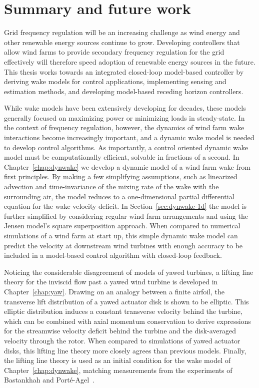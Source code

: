 \chapter{Summary and future work}
\label{chap:conclusions}

Grid frequency regulation will be an increasing challenge as wind energy and other renewable energy sources continue to grow. Developing controllers that allow wind farms to provide secondary frequency regulation for the grid effectively will therefore speed adoption of renewable energy sources in the future. This thesis works towards an integrated closed-loop model-based controller by deriving wake models for control applications, implementing sensing and estimation methods, and developing model-based receding horizon controllers.

While wake models have been extensively developing for decades, these models generally focused on maximizing power or minimizing loads in steady-state. In the context of frequency regulation, however, the dynamics of wind farm wake interactions become increasingly important, and a dynamic wake model is needed to develop control algorithms. As importantly, a control oriented dynamic wake model must be computationally efficient, solvable in fractions of a second. In Chapter~\ref{chap:dynwake} we develop a dynamic model of a wind farm wake from first principles. By making a few simplifying assumptions, such as linearized advection and time-invariance of the mixing rate of the wake with the surrounding air, the model reduces to a one-dimensional partial differential equation for the wake velocity deficit. In Section~\ref{sec:dynwake-1d} the model is further simplified by considering regular wind farm arrangements and using the Jensen model's square superposition approach. When compared to numerical simulations of a wind farm at start up, this simple dynamic wake model can predict the velocity at downstream wind turbines with enough accuracy to be included in a model-based control algorithm with closed-loop feedback.

Noticing the considerable disagreement of models of yawed turbines, a lifting line theory for the inviscid flow past a yawed wind turbine is developed in Chapter~\ref{chap:yaw}. Drawing on an analogy between a finite airfoil, the transverse lift distribution of a yawed actuator disk is shown to be elliptic. This elliptic distribution induces a constant transverse velocity behind the turbine, which can be combined with axial momentum conservation to derive expressions for the streamwise velocity deficit behind the turbine and the disk-averaged velocity through the rotor. When compared to simulations of yawed actuator disks, this lifting line theory more closely agrees than previous models. Finally, the lifting line theory is used as an initial condition for the wake model of Chapter~\ref{chap:dynwake}, matching measurements from the experiments of Bastankhah and Port\'{e}-Agel~\cite{Bastankhah2016a}. 

